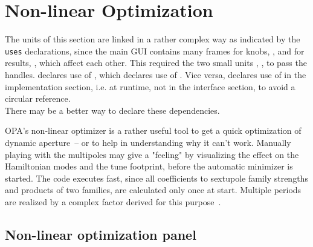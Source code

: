 \documentclass[12pt]{article}
\newcommand\code[1]{{\tt #1}}
\newcommand{\opagui}[1]{\colorbox{blue!20}{{\color{black}\code{#1}}}}
\newcommand{\oguih}[2]{\subsection{\label{#2}#1}{\Huge\opagui{#2}}\\}
\newcommand{\ogui}[1]{\hyperref[#1]{\opagui{#1}}}
\newcommand{\opaguif}[1]{\colorbox{violet!30}{{\color{black}\code{#1}}}}
\newcommand{\oguif}[1]{\hyperref[#1]{\opaguif{#1}}}
\newcommand{\opauni}[1]{\colorbox{orange!30}{{\color{black}\code{#1}}}}
\newcommand{\ouni}[1]{\hyperref[#1]{\opauni{#1}}}
\newcommand{\todo}[1]{{\color{red} #1}}
\newcommand{\feature}[1]{{\color{cadmiumgreen} #1}}
\begin{document}
\section{\label{secnonl}Non-linear Optimization}

The units of this section are linked in a rather complex way as indicated by the \code{uses} declarations, since the main GUI \ogui{opachroma} contains many frames for knobs, \oguif{csexframe}, and for results, \oguif{chamframe}, which affect each other. This required the two small units \ouni{chromreslib}, \ouni{chromelelib}, to pass the handles. \oguif{csexframe} declares use of \ouni{chromreslib}, which declares use of \oguif{chamframe}. Vice versa,
\oguif{chamframe} declares use of \oguif{csexframe} in the implementation section, i.e. at runtime, not in the interface section, to avoid a circular reference. \\
\todo{There may be a better way to declare these dependencies.}

\feature{OPA's non-linear optimizer is a rather useful tool to get a quick optimization of dynamic aperture~-- or to help in understanding why it can't work. Manually playing with the multipoles may give a "feeling" by visualizing the effect on the Hamiltonian modes and the tune footprint, before the automatic minimizer is started. The code executes fast, since all coefficients to sextupole family strengths and products of two families, are calculated only once at start. Multiple periods are realized by a complex factor derived for this purpose~\cite{inside}.}

\oguih{Non-linear optimization panel}{opachroma} 
\end{document}

